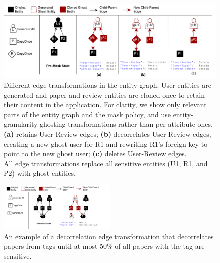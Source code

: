 \begin{figure}[t!]
    \centering
    \includegraphics[width=\textwidth]{img/edge_transforms}

    \caption{Different edge transformations in the entity graph. User entities are generated and
    paper and review entities are cloned once to retain their content in the application. 
    For clarity, we show only relevant parts of the entity graph and the mask policy, and use entity-granularity ghosting
        transformations rather than per-attribute ones.\\
    \textbf{(a)} retains User-Review edges;
    \textbf{(b)} decorrelates User-Review edges, creating a new ghost user for R1 and rewriting R1's 
    foreign key to point to the new ghost user;
    \textbf{(c)} deletes User-Review edges.\\
    All edge transformations replace all sensitive entities (U1, R1, and P2) with ghost entities.
    }
    \label{fig:edgepol}
\end{figure}

\begin{figure}[t!]
    \centering
    \includegraphics[width=0.5\textwidth]{img/child-parent}

    \caption{An example of a decorrelation edge transformation that decorrelates papers from tags
    until at most 50\% of all papers with the tag are sensitive.
    }
    \label{fig:sensitivity}
\end{figure}


